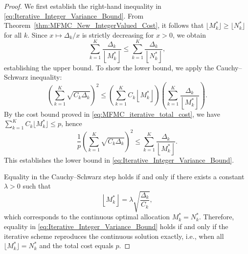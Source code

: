 \begin{proof}
We first establish the right-hand inequality in \eqref{eq:Iterative_Integer_Variance_Bound}.  
From Theorem~\ref{thm:MFMC_New_IntegerValued_Cost}, it follows that $\lfloor M_k^* \rfloor \ge \lfloor N_k^* \rfloor$ for all $k$.  
Since $x \mapsto \Delta_k/x$ is strictly decreasing for $x > 0$, we obtain
\[
\sum_{k=1}^K \frac{\Delta_k}{\left\lfloor M_k^* \right\rfloor}
\le 
\sum_{k=1}^K \frac{\Delta_k}{\left\lfloor N_k^* \right\rfloor},
\]
establishing the upper bound. To show the lower bound, we apply the Cauchy--Schwarz inequality:
\[
\left(\sum_{k=1}^K \sqrt{C_k \Delta_k}\right)^2
\le
\left(\sum_{k=1}^K C_k \left\lfloor M_k^* \right\rfloor\right)
\left(\sum_{k=1}^K \frac{\Delta_k}{\left\lfloor M_k^* \right\rfloor}\right).
\]
By the cost bound proved in \eqref{eq:MFMC_iterative_total_cost}, we have 
$\sum_{k=1}^K C_k \lfloor M_k^* \rfloor \le p$, hence
%
\[
\frac{1}{p}\left(\sum_{k=1}^K \sqrt{C_k \Delta_k}\right)^2
\le
\sum_{k=1}^K \frac{\Delta_k}{\left\lfloor M_k^* \right\rfloor}.
\]
%
This establishes the lower bound in \eqref{eq:Iterative_Integer_Variance_Bound}.

\vspace{4mm}
Equality in the Cauchy--Schwarz step holds if and only if there exists a constant $\lambda>0$ such that 
\[
\left\lfloor M_k^* \right\rfloor = \lambda \sqrt{\frac{\Delta_k}{C_k}},
\]
which corresponds to the continuous optimal allocation $M_k^* = N_k^*$. Therefore, equality in \eqref{eq:Iterative_Integer_Variance_Bound} holds if and only if the iterative scheme reproduces the continuous solution exactly, i.e., when all $\lfloor M_k^* \rfloor = N_k^*$ and the total cost equals $p$.

\end{proof}
